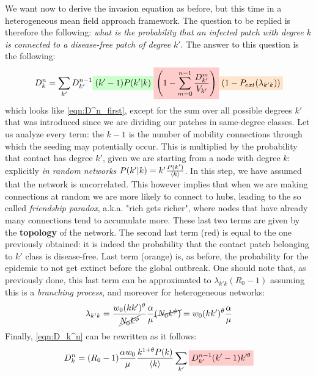 \documentclass[../main/main.tex]{subfiles}
\begin{document}
We want now to derive the invasion equation as before, but this time in a heterogeneous mean field approach framework. The question to be replied is therefore the following: \textit{what is the probability that an infected patch with degree $k$ is connected to a disease-free patch of degree} $k'$. The answer to this question is the following:
\begin{equation}
    D_k^n = \sum_{k'}D_{k'}^{n-1} \mathcolorbox{green!20}{(k'-1) P (k'|k)} \mathcolorbox{red!20}{\qty( 1-\sum_{m=0}^{n-1} \frac{D_{k'}^m}{V_{k'}} ) } \mathcolorbox{orange!20}{ (1-P_{ext}(\lambda_{k'k})) }
    \label{eqn:D_k^n}
\end{equation}
which looks like \ref{eqn:D^n_first}, except for the sum over all possible degrees $k'$ that was introduced since we are dividing our patches in same-degree classes. Let us analyze every term: the $k-1$ is the number of mobility connections through which the seeding may potentially occur. This is multiplied by the probability that contact has degree $k'$, given we are starting from a node with degree $k$: explicitly \textit{in random networks} $P(k'|k) = k' \frac{P(k')}{\expval{k}}$. In this step, we have assumed that the network is uncorrelated. This however implies that when we are making connections at random we are more likely to connect to hubs, leading to the so called \textit{friendship paradox}, a.k.a. "rich gets richer", where nodes that have already many connections tend to accumulate more. These last two terms are given by the \textbf{topology} of the network.
The second last term (red) is equal to the one previously obtained: it is indeed the probability that the contact patch belonging to $k'$ class is disease-free. Last term (orange) is, as before, the probability for the epidemic to not get extinct before the global outbreak.
One should note that, as previously done, this last term can be approximated to $\lambda_{k' k}(R_0 - 1 )$ assuming this is a \textit{branching process}, and moreover for heterogeneous networks:
\begin{equation*}
    \lambda_{k' k} = \frac{w_0 (k k')^\theta}{ \cancel{ N_0 k^\phi}} \frac{\alpha}{\mu} \cancel{ (N_0 k^\phi) }
    = w_0 (kk')^\theta \frac{\alpha}{\mu}
\end{equation*}
Finally, \ref{eqn:D_k^n} can be rewritten as it follows:
\begin{equation}
     D_k^n = (R_0 - 1)
     \frac{\alpha w_0}{\mu}
     \frac{k^{1+\theta}P(k)}{\expval{k}} \sum_{k'}
      \mathcolorbox{red!20}{D_{k'}^{n-1} (k'-1) k'^{\theta }}
    \label{eqn:D_k^n_second}
\end{equation}
\end{document}
